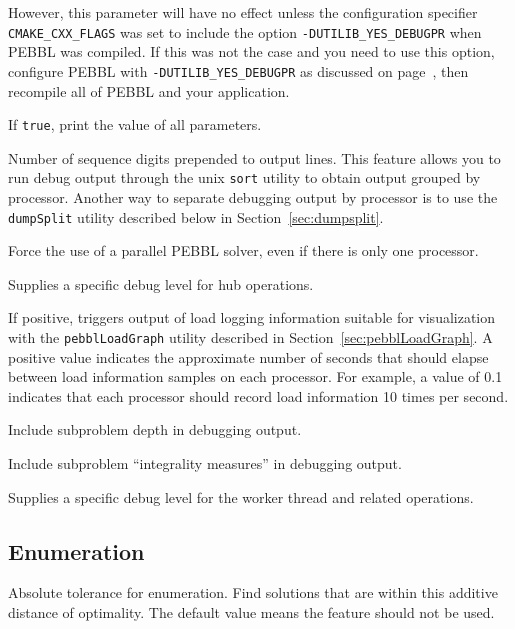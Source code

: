 However, this parameter will have no effect unless the configuration specifier
\texttt{CMAKE\_CXX\_\linebreak[1]FLAGS} was set to include the option
\texttt{-DUTILIB\_YES\_DEBUGPR} when PEBBL was compiled.  If this was not the
case and you need to use this option, configure PEBBL with
\texttt{-DUTILIB\_YES\_\linebreak[1]DEBUGPR} as discussed on
page~\pageref{advancedoptions}, then recompile all of PEBBL and your
application.

If \texttt{true}, print the value of all parameters.

Number of sequence digits prepended to output lines.  This feature
allows you to run debug output through the unix \texttt{sort} utility
to obtain output grouped by processor.  Another way to separate
debugging output by processor is to use the \texttt{dumpSplit} 
utility described below in Section~\ref{sec:dumpsplit}.

 Force the use of a parallel PEBBL
solver, even if there is only one processor.  

Supplies a specific debug level for hub operations.

 If positive, triggers output of
load logging information suitable for visualization with the 
\texttt{pebblLoadGraph} utility described in
Section~\ref{sec:pebblLoadGraph}.  A positive value indicates the
approximate number of seconds that should elapse between load information
samples on each processor.  For example, a value of 0.1 indicates that
each processor should record load information 10 times per second.

Include subproblem depth in debugging output.

Include subproblem ``integrality measures'' in debugging output.

Supplies a specific debug level for the worker thread and related operations.


\subsection{Enumeration}
\vspace{-3ex}
Absolute tolerance for enumeration.  Find solutions
that are within this additive distance of optimality.  The default
value means the feature should not be used.

